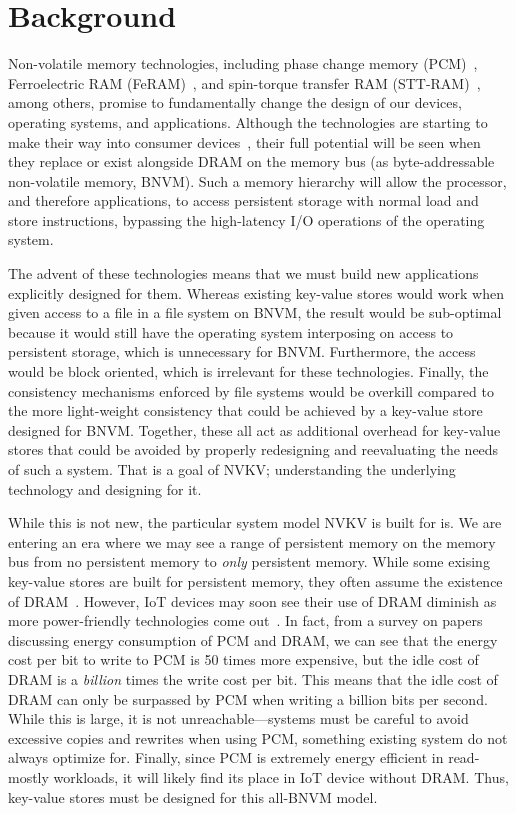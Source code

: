 \section{Background}

Non-volatile memory technologies, including phase change memory
(PCM)~\cite{lee_architecting_2009,wong2010phase}, Ferroelectric RAM
(FeRAM)~\cite{fox:2001feram}, and spin-torque transfer RAM (STT-RAM)~\cite{sttram},
among others, promise to fundamentally change the design of our
devices, operating systems, and applications. Although the technologies are
starting to make their way into consumer devices~\cite{intel3dxpoint}, their
full potential will be seen when they replace or exist alongside DRAM on the
memory bus (as byte-addressable non-volatile memory, BNVM).
Such a memory hierarchy will allow the processor, and therefore
applications, to access persistent storage with normal load and store
instructions, bypassing the high-latency I/O operations of the operating system.

The advent of these technologies means that we must build new applications
explicitly designed for them. Whereas existing key-value stores would work when
given access to a file in a file system on BNVM, the result would be sub-optimal
because it would still have the operating system interposing on access to
persistent storage, which is unnecessary for BNVM. Furthermore, the access would
be block oriented, which is irrelevant for these technologies. Finally, the
consistency mechanisms enforced by file systems would be overkill compared to
the more light-weight consistency that could be achieved by a key-value store
designed for BNVM. Together, these all act as additional overhead for key-value
stores that could be avoided by properly redesigning and reevaluating the needs
of such a system. That is a goal of NVKV; understanding the underlying
technology and designing for it.

While this is not new, the particular system model NVKV is built for is. We are
entering an era where we may see a range of persistent memory on the memory bus
from no persistent memory to \textit{only} persistent memory. While some exising
key-value stores are built for persistent memory, they often assume the
existence of DRAM~\cite{echo,Arulraj:2016wbl}. However, IoT devices may soon see
their use of DRAM diminish as more power-friendly technologies come
out~\cite{Jayakumar2014powering}. In fact, from a survey on
papers~\cite{dhiman_pdram:_2009,lee_architecting_2009,xiangyu_dong_nvsim:_2012,qureshi_scalable_2009,Chen_rethinkingdatabase,bedeschi_8mb_2004} discussing
energy consumption of PCM and DRAM, we can see that the energy cost per bit to
write to PCM is 50 times more expensive, but
the idle cost of DRAM is a \textit{billion} times the write cost per bit. This
means that the idle cost of DRAM can only be surpassed by PCM when writing a
billion bits per second. While this is large, it is not unreachable---systems
must be careful to avoid excessive copies and rewrites when using PCM, something 
existing system do not always optimize for. Finally, since PCM is
extremely energy efficient in read-mostly workloads, it will likely find its
place in IoT device without DRAM. Thus, key-value stores must be designed for
this all-BNVM model.

